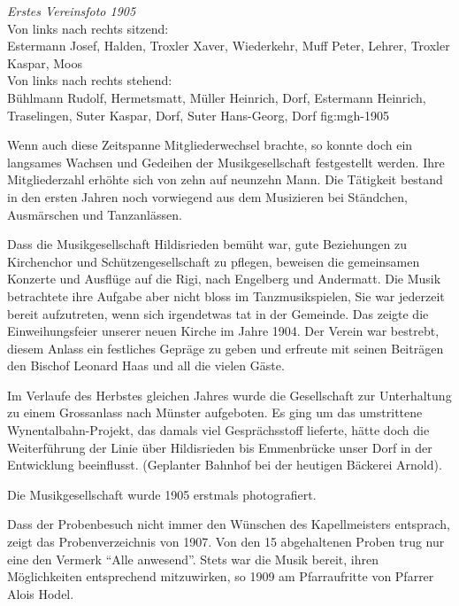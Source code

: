 

{\emph{Erstes Vereinsfoto 1905}\\
    Von links nach rechts sitzend:\\
    Estermann Josef, Halden, Troxler Xaver, Wiederkehr, Muff Peter, Lehrer,
    Troxler Kaspar, Moos\\
    Von links nach rechts stehend:\\
    Bühlmann Rudolf, Hermetsmatt, Müller Heinrich, Dorf, Estermann Heinrich,
    Traselingen, Suter Kaspar, Dorf, Suter Hans-Georg, Dorf} {fig:mgh-1905}

\begin{history}


    Wenn auch diese Zeitspanne Mitgliederwechsel brachte, so konnte doch ein
    langsames Wachsen und Gedeihen der Musikgesellschaft festgestellt werden.
    Ihre Mitgliederzahl erhöhte sich von zehn auf neunzehn Mann. Die Tätigkeit
    bestand in den ersten Jahren noch vorwiegend aus dem Musizieren bei
    Ständchen, Ausmärschen und Tanzanlässen.

    Dass die Musikgesellschaft Hildisrieden bemüht war, gute Beziehungen zu
    Kirchenchor und Schützengesellschaft zu pflegen, beweisen die gemeinsamen
    Konzerte und Ausflüge auf die Rigi, nach Engelberg und Andermatt. Die Musik
    betrachtete ihre Aufgabe aber nicht bloss im Tanzmusikspielen, Sie war
    jederzeit bereit aufzutreten, wenn sich irgendetwas tat in der Gemeinde. Das
    zeigte die Einweihungsfeier unserer neuen Kirche im Jahre 1904. Der Verein
    war bestrebt, diesem Anlass ein festliches Gepräge zu geben und erfreute mit
    seinen Beiträgen den Bischof Leonard Haas und all die vielen Gäste.

    Im Verlaufe des Herbstes gleichen Jahres wurde die Gesellschaft zur
    Unterhaltung zu einem Grossanlass nach Münster aufgeboten. Es ging um das
    umstrittene Wynentalbahn-Projekt, das damals viel Gesprächsstoff lieferte,
    hätte doch die Weiterführung der Linie über Hildisrieden bis Emmenbrücke
    unser Dorf in der Entwicklung beeinflusst. (Geplanter Bahnhof bei der
    heutigen Bäckerei Arnold).

    Die Musikgesellschaft wurde 1905 erstmals photografiert.

    Dass der Probenbesuch nicht immer den Wünschen des Kapellmeisters entsprach,
    zeigt das Probenverzeichnis von 1907. Von den 15 abgehaltenen Proben trug
    nur eine den Vermerk \enquote{Alle anwesend}. Stets war die Musik bereit,
    ihren Möglichkeiten entsprechend mitzuwirken, so 1909 am Pfarraufritte von
    Pfarrer Alois Hodel.


\end{history}
